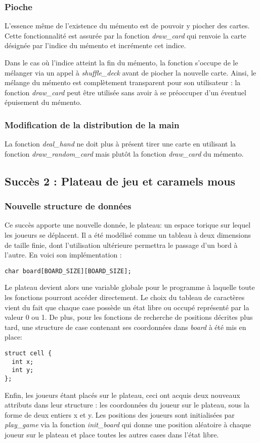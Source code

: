 \documentclass[12pt]{article}
\begin{document}
\subsubsection{Pioche}

L'essence même de l'existence du mémento est de pouvoir y piocher des cartes. Cette fonctionnalité est assurée par la fonction \textit{draw\_card} qui renvoie la carte désignée par l'indice du mémento et incrémente cet indice.

Dans le cas où l'indice atteint la fin du mémento, la fonction s'occupe de le mélanger via un appel à \textit{shuffle\_deck} avant de piocher la nouvelle carte. Ainsi, le mélange du mémento est complètement transparent pour son utilisateur : la fonction \textit{draw\_card} peut être utilisée sans avoir à se préoccuper d'un éventuel épuisement du mémento.

\subsubsection{Modification de la distribution de la main}

La fonction \textit{deal\_hand} ne doit plus à présent tirer une carte en utilisant la fonction \textit{draw\_random\_card} mais plutôt la fonction \textit{draw\_card} du mémento.

\subsection{Succès 2 : Plateau de jeu et caramels mous}

\subsubsection{Nouvelle structure de données}

Ce succès apporte une nouvelle donnée, le plateau: un espace torique sur lequel les joueurs se déplacent.
Il a été modélisé comme un tableau à deux dimensions de taille finie, dont l'utilisation ultérieure permettra le passage d'un bord à l'autre.
En voici son implémentation :
\begin{verbatim}
char board[BOARD_SIZE][BOARD_SIZE];
\end{verbatim}
Le plateau devient alors une variable globale pour le programme à  laquelle toute les fonctions pourront accéder directement. Le choix du tableau de caractères vient du fait que chaque case possède un état libre ou occupé représenté par la valeur 0 ou 1.
De plus, pour les fonctions de recherche de positions décrites plus tard, une structure de case contenant ses coordonnées dans \textit{board} à été mis en place:
\begin{verbatim}
struct cell {
  int x;
  int y;
};
\end{verbatim}
Enfin, les joueurs étant placés sur le plateau, ceci ont acquis deux nouveaux attributs dans leur structure : les coordonnées du joueur sur le plateau, sous la forme de deux entiers x et y.
Les positions des joueurs sont initialisées par \textit{play\_game} via la fonction \textit{init\_board} qui donne une position aléatoire à chaque joueur sur le plateau et place toutes les autres cases dans l'état libre.
\end{document}
